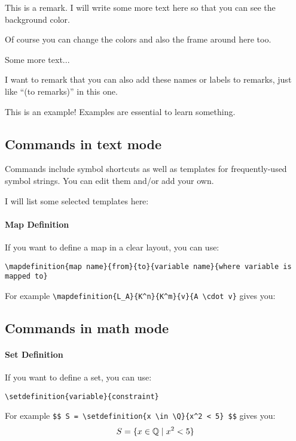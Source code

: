 \documentclass[11pt, a4paper]{article}
\begin{document}
\begin{remark}
  This is a remark. I will write some more text here so that you can see the background color.

  Of course you can change the colors and also the frame around here too.

  Some more text...
\end{remark}

\begin{remark}[to remarks]
  I want to remark that you can also add these names or labels to remarks, just like ``(to remarks)'' in this one.
\end{remark}

\begin{example}
  This is an example! Examples are essential to learn something.
\end{example}

\subsection{Commands in text mode}

Commands include symbol shortcuts as well as templates for frequently-used symbol strings. You can edit them and/or add your own.

I will list some selected templates here:

\paragraph{Map Definition}

If you want to define a map in a clear layout, you can use:
\begin{center}\verb|\mapdefinition{map name}{from}{to}{variable name}{where variable is mapped to}|\end{center}
For example \verb|\mapdefinition{L_A}{K^n}{K^m}{v}{A \cdot v}| gives you:

\subsection{Commands in math mode}

\paragraph{Set Definition}

If you want to define a set, you can use:
\begin{center}\verb|\setdefinition{variable}{constraint}|\end{center}
For example \verb|$$ S = \setdefinition{x \in \Q}{x^2 < 5} $$| gives you:
$$ S = \{x \in \mathbb{Q} \mid x^2 < 5\} $$
\end{document}
